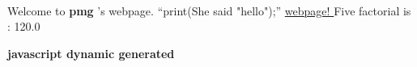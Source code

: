 \documentclass{article}
\begin{document}

~

\noindent Welcome to \textbf{pmg }'s webpage. ``print(She said "hello");'' \href{http://www.douban.com}{\underline{webpage! }}Five factorial is : 120.0 
~

\noindent \textbf{javascript dynamic generated }
\end{document}
